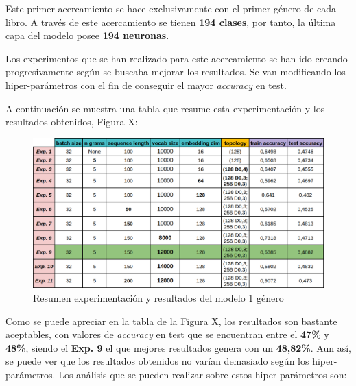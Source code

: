 \documentclass[12pt,a4paper, xcolor=table]{article}
\begin{document}
Este primer acercamiento se hace exclusivamente con el primer género de cada libro. A través de este acercamiento se tienen \textbf{194 clases}, por tanto, la última capa del modelo posee \textbf{194 neuronas}.

\vspace{2mm}

Los experimentos que se han realizado para este acercamiento se han ido creando progresivamente según se buscaba mejorar los resultados. Se van modificando los hiper-parámetros con el fin de conseguir el mayor \textit{accuracy} en test.

\vspace{1mm}

A continuación se muestra una tabla que resume esta experimentación y los resultados obtenidos, Figura X:

\newpage

\begin{figure}[!h]
    \centering
    \includegraphics[width=500px]{img/one.png}
    \caption{Resumen experimentación y resultados del modelo 1 género}
\end{figure}

Como se puede apreciar en la tabla de la Figura X, los resultados son bastante aceptables, con valores de \textit{accuracy} en test que se encuentran entre el \textbf{47\%} y \textbf{48\%}, siendo el \textbf{Exp. 9} el que mejores resultados genera con un \textbf{48,82\%}. Aun así, se puede ver que los resultados obtenidos no varían demasiado según los hiper-parámetros. Los análisis que se pueden realizar sobre estos hiper-parámetros son:
\end{document}
